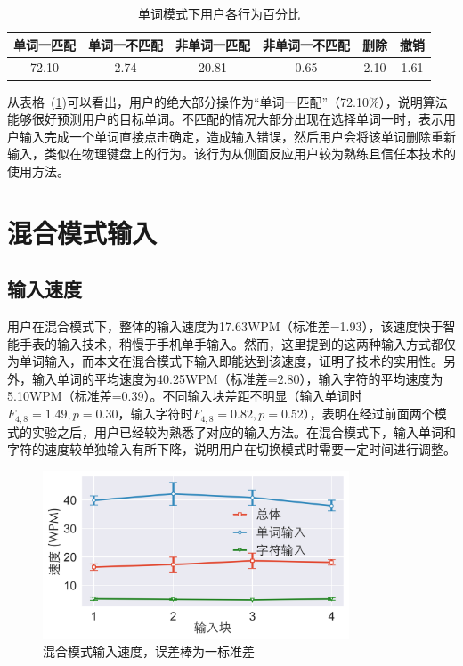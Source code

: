 \begin{table}[h]
  \centering
  \begin{minipage}[t]{0.9\linewidth} %
  \caption[单词模式下用户各行为百分比]{单词模式下用户各行为百分比}
  \label{tab:word-stat}
    \centering
    \begin{tabularx}{\linewidth}{cccccc}
      \toprule[1.5pt]
      单词一匹配 & 单词一不匹配 & 非单词一匹配 & 非单词一不匹配 & 删除 & 撤销\\\midrule[1pt]
      72.10 & 2.74 & 20.81 & 0.65 & 2.10 & 1.61\\
      \bottomrule[1.5pt]
    \end{tabularx}
  \end{minipage}
\end{table}

从表格~(\ref{tab:word-stat})可以看出，用户的绝大部分操作为“单词一匹配”（72.10\%），说明算法能够很好预测用户的目标单词。不匹配的情况大部分出现在选择单词一时，表示用户输入完成一个单词直接点击确定，造成输入错误，然后用户会将该单词删除重新输入，类似在物理键盘上的行为。该行为从侧面反应用户较为熟练且信任本技术的使用方法。


\section{混合模式输入} 

\subsection{输入速度}
用户在混合模式下，整体的输入速度为17.63WPM（标准差=1.93），该速度快于智能手表的输入技术\cite{compass}，稍慢于手机单手输入\cite{2017blindtype}。然而，这里提到的这两种输入方式都仅为单词输入，而本文在混合模式下输入即能达到该速度，证明了技术的实用性。另外，输入单词的平均速度为40.25WPM（标准差=2.80），输入字符的平均速度为5.10WPM（标准差=0.39）。不同输入块差距不明显（输入单词时$F_{4,8}=1.49, p =0.30$，输入字符时$F_{4,8}=0.82, p =0.52$），表明在经过前面两个模式的实验之后，用户已经较为熟悉了对应的输入方法。在混合模式下，输入单词和字符的速度较单独输入有所下降，说明用户在切换模式时需要一定时间进行调整。

\begin{figure}[h] %
    \centering
    \includegraphics[height=5cm]{figures/wholespeed.png}
    \caption{混合模式输入速度，误差棒为一标准差}
    \label{fig:wholespeed}
\end{figure}


